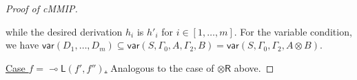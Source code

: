 \documentclass[sn-mathphys-num]{sn-jnl}%
\newcommand{\GG}{\Gamma}
\newcommand{\GD}{\Delta}
\newcommand{\GL}{\Lambda}
\newcommand{\GO}{\Omega}
\newcommand{\vd}{\vdash}
\newcommand{\tr}{\otimes\mathsf{R}}
\newcommand{\ot}{\otimes}
\newcommand{\lolli}{\multimap}
\newcommand{\lleft}{{\lolli}\mathsf{L}}
\newcommand{\mf}[1]{\mathsf{#1}}
\newcommand{\gs}[1]{\sigma_{X} (#1)}
\newcommand{\vars}[1]{\mf{var} (#1)}
\newcommand{\cMMIP}{\textsf{cMMIP}}
\theoremstyle{thmstyleone}%
\theoremstyle{thmstyletwo}%
\newtheorem{lemma}[theorem]{Lemma}
\theoremstyle{thmstylethree}%
\begin{document}
\begin{proof}[Proof of \cMMIP]
\begin{itemize}
\begin{displaymath}
{      }
    \end{displaymath}
    while the desired derivation $h_i$ is $h'_i$ for $i \in [1,\dots,m]$.
    For the variable condition, we have
    $\vars{D_1,\dots,D_m} \subseteq \vars{S, \GG_0 , A , \GG_2 , B} = \vars{S , \GG_0 , \GG_2 , A \ot B}$.
  \end{itemize}
  \underline{Case $f = \lleft (f',f'') $.} Analogous to the case of $\tr$ above.
\end{proof}
\end{document}
